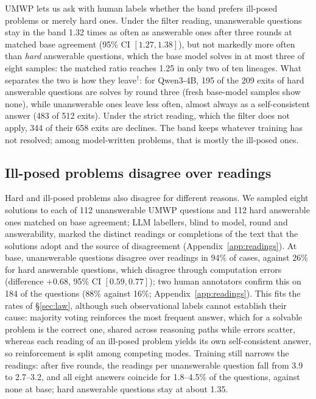 UMWP lets us ask with human labels whether the band prefers ill-posed problems or merely hard ones. Under the filter reading, unanswerable questions stay in the band 1.32 times as often as answerable ones after three rounds at matched base agreement (95\% CI $[1.27, 1.38]$), but not markedly more often than \emph{hard} answerable questions, which the base model solves in at most three of eight samples: the matched ratio reaches 1.25 in only two of ten lineages. What separates the two is how they leave$^{\dagger}$: for Qwen3-4B, 195 of the 209 exits of hard answerable questions are solves by round three (fresh base-model samples show none), while unanswerable ones leave less often, almost always as a self-consistent answer (483 of 512 exits). Under the strict reading, which the filter does not apply, 344 of their 658 exits are declines. The band keeps whatever training has not resolved; among model-written problems, that is mostly the ill-posed ones.

\subsection{Ill-posed problems disagree over readings}
\label{sec:readings}

Hard and ill-posed problems also disagree for different reasons. We sampled eight solutions to each of 112 unanswerable UMWP questions and 112 hard answerable ones matched on base agreement; LLM labellers, blind to model, round and answerability, marked the distinct readings or completions of the text that the solutions adopt and the source of disagreement (Appendix~\ref{app:readings}). At base, unanswerable questions disagree over readings in 94\% of cases, against 26\% for hard answerable questions, which disagree through computation errors (difference $+0.68$, 95\% CI $[0.59, 0.77]$); two human annotators confirm this on 184 of the questions (88\% against 16\%; Appendix~\ref{app:readings}). This fits the rates of \S\ref{sec:law}, although such observational labels cannot establish their cause: majority voting reinforces the most frequent answer, which for a solvable problem is the correct one, shared across reasoning paths while errors scatter, whereas each reading of an ill-posed problem yields its own self-consistent answer, so reinforcement is split among competing modes. Training still narrows the readings: after five rounds, the readings per unanswerable question fall from 3.9 to 2.7--3.2, and all eight answers coincide for 1.8--4.5\% of the questions, against none at base; hard answerable questions stay at about 1.35.
